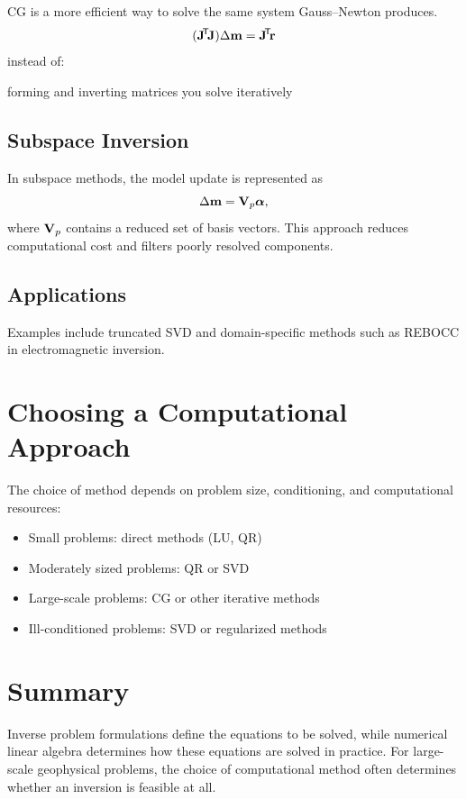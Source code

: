 CG is a more efficient way to solve the same system Gauss–Newton produces.
\[
    (\vb{J}\!^\mathsf{T}\! \vb{J}) \Delta \vb{m} = \vb{J}\!^\mathsf{T}\! \vb{r}
\]
instead of:

forming and inverting matrices
you solve iteratively

\subsection{Subspace Inversion}

In subspace methods, the model update is represented as
\[
    \Delta \vb{m} = \vb{V}_p \boldsymbol{\alpha},
\]
where $\vb{V}_p$ contains a reduced set of basis vectors. This approach reduces computational cost and filters poorly resolved components.

\subsection{Applications}

Examples include truncated SVD and domain-specific methods such as REBOCC in electromagnetic inversion.

\section{Choosing a Computational Approach}

The choice of method depends on problem size, conditioning, and computational resources:

\begin{itemize}
    \item Small problems: direct methods (LU, QR)
    \item Moderately sized problems: QR or SVD
    \item Large-scale problems: CG or other iterative methods
    \item Ill-conditioned problems: SVD or regularized methods
\end{itemize}

\section{Summary}

Inverse problem formulations define the equations to be solved, while numerical linear algebra determines how these equations are solved in practice. For large-scale geophysical problems, the choice of computational method often determines whether an inversion is feasible at all.
